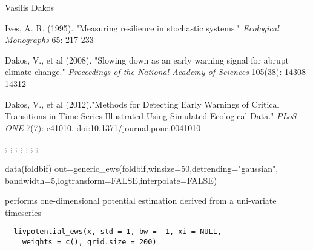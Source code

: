 \documentclass[a4paper]{book}
\begin{document}
%
\begin{Author}\relax
Vasilis Dakos 
\end{Author}
%
\begin{References}\relax
Ives, A. R. (1995). "Measuring resilience in stochastic
systems." \emph{Ecological Monographs} 65: 217-233

Dakos, V., et al (2008). "Slowing down as an early
warning signal for abrupt climate change."
\emph{Proceedings of the National Academy of Sciences}
105(38): 14308-14312

Dakos, V., et al (2012)."Methods for Detecting Early
Warnings of Critical Transitions in Time Series
Illustrated Using Simulated Ecological Data." \emph{PLoS
ONE} 7(7): e41010. doi:10.1371/journal.pone.0041010
\end{References}
%
\begin{SeeAlso}\relax
{}; ;
; ;
; ;
;
\end{SeeAlso}
%
\begin{Examples}
\begin{ExampleCode}
data(foldbif)
 out=generic_ews(foldbif,winsize=50,detrending="gaussian",
 bandwidth=5,logtransform=FALSE,interpolate=FALSE)
\end{ExampleCode}
\end{Examples}
%
\begin{Description}\relax
{} performs one-dimensional
potential estimation derived from a uni-variate
timeseries
\end{Description}
%
\begin{Usage}
\begin{verbatim}
  livpotential_ews(x, std = 1, bw = -1, xi = NULL,
    weights = c(), grid.size = 200)
\end{verbatim}
\end{Usage}
%
\end{document}
